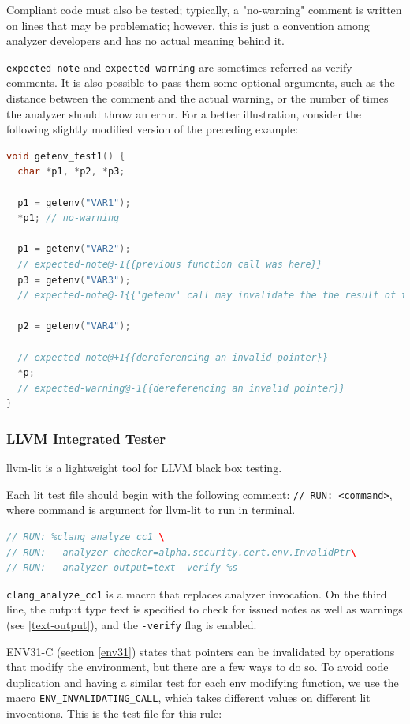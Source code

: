 Compliant code must also be tested; typically, a "no-warning" comment is written on lines that may be problematic; however, this is just a convention among analyzer developers and has no actual meaning behind it. 

\lstinline{expected-note} and \lstinline{expected-warning} are sometimes referred as verify comments. It is also possible to pass them some optional arguments, such as the distance between the comment and the actual warning, or the number of times the analyzer should throw an error.
For a better illustration, consider the following slightly modified version of the preceding example: 

\begin{lstlisting}[language={C++}]
void getenv_test1() {
  char *p1, *p2, *p3;

  p1 = getenv("VAR1");
  *p1; // no-warning

  p1 = getenv("VAR2");
  // expected-note@-1{{previous function call was here}}
  p3 = getenv("VAR3");
  // expected-note@-1{{'getenv' call may invalidate the the result of the previous 'getenv'}}

  p2 = getenv("VAR4");
  
  // expected-note@+1{{dereferencing an invalid pointer}}
  *p;
  // expected-warning@-1{{dereferencing an invalid pointer}}
}

\end{lstlisting}

\subsubsection{LLVM Integrated Tester}
llvm-lit is a lightweight tool for LLVM black box testing.

Each lit test file should begin with the following comment:
\lstinline{// RUN: <command>}, where command is argument for llvm-lit to run in terminal. 

\begin{lstlisting}[language={C++}]
// RUN: %clang_analyze_cc1 \
// RUN:  -analyzer-checker=alpha.security.cert.env.InvalidPtr\
// RUN:  -analyzer-output=text -verify %s
\end{lstlisting}


\lstinline{clang_analyze_cc1} is a macro that replaces analyzer invocation.
On the third line, the output type text is specified to check for issued notes as well as warnings (see \ref{text-output}), and the \lstinline{-verify} flag is enabled. 


ENV31-C (section \ref{env31}) states that pointers can be invalidated by operations that modify the environment, but there are a few ways to do so.
To avoid code duplication and having a similar test for each env modifying function, we use the macro \lstinline{ENV_INVALIDATING_CALL}, which takes different values on different lit invocations. This is the test file for this rule: 

